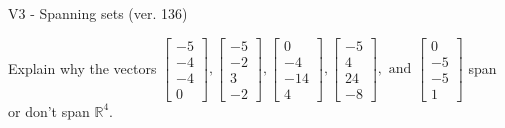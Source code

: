 \begin{exercise}
  \begin{exerciseTitle}V3 - Spanning sets (ver. 136)\end{exerciseTitle}
  \begin{exerciseStatement}
    Explain why the vectors \(\left[\begin{array}{r}
-5 \\
-4 \\
-4 \\
0
\end{array}\right] , \left[\begin{array}{r}
-5 \\
-2 \\
3 \\
-2
\end{array}\right] , \left[\begin{array}{r}
0 \\
-4 \\
-14 \\
4
\end{array}\right] , \left[\begin{array}{r}
-5 \\
4 \\
24 \\
-8
\end{array}\right] , \text{ and } \left[\begin{array}{r}
0 \\
-5 \\
-5 \\
1
\end{array}\right]\) span or don't span \(\mathbb{R}^4\). 
	



\end{exerciseStatement}
\end{exercise}
